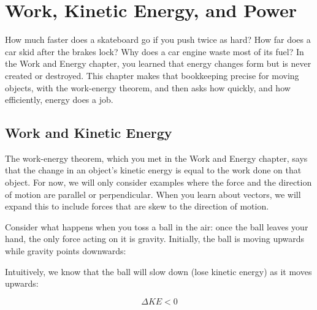 \chapter{Work, Kinetic Energy, and Power}

How much faster does a skateboard go if you push twice as hard? How far does a car skid after the brakes lock?
Why does a car engine waste most of its fuel? In the Work and Energy chapter, you learned that energy changes form
but is never created or destroyed. This chapter makes that bookkeeping precise for moving objects, with the
work-energy theorem, and then asks how quickly, and how efficiently, energy does a job.

\section{Work and Kinetic Energy}
The work-energy theorem, which you met in the Work and Energy chapter, says that the change in an object's 
kinetic energy is equal to the work done on that object. For now, we will only 
consider examples where the force and the direction of motion are parallel or 
perpendicular. When you learn about vectors, we will expand this to include 
forces that are skew to the direction of motion. 

Consider what happens when you toss a ball in the air: once the ball leaves your 
hand, the only force acting on it is gravity. Initially, the ball is moving 
upwards while gravity points downwards:

\begin{center}
\end{center}

Intuitively, we know that the ball will slow down (lose kinetic energy) as it 
moves upwards:

$$\Delta KE < 0$$

